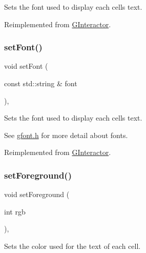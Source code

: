 Sets the font used to display each cell\textquotesingle{}s text. 



Reimplemented from \mbox{\hyperlink{classGInteractor_a2592348886ffea646c6534bf88f7c49d}{G\+Interactor}}.

\mbox{\label{classGTable_a51367c9fd2709973b1f7238734f93891}} 
\subsubsection{\texorpdfstring{set\+Font()}{setFont()}\hspace{0.1cm}{\footnotesize\ttfamily [2/2]}}
{\footnotesize\ttfamily void set\+Font (\begin{DoxyParamCaption}\item[{const std\+::string \&}]{font }\end{DoxyParamCaption})\hspace{0.3cm}{\ttfamily [override]}, {\ttfamily [virtual]}}



Sets the font used to display each cell\textquotesingle{}s text. 

See \mbox{\hyperlink{gfont_8h_source}{gfont.\+h}} for more detail about fonts. 

Reimplemented from \mbox{\hyperlink{classGInteractor_a8e096e8818d838aceae1d46d58fb3a7b}{G\+Interactor}}.

\mbox{\label{classGTable_a59f7cd2bd1708c12dfa52a8f7c7b79c9}} 
\subsubsection{\texorpdfstring{set\+Foreground()}{setForeground()}\hspace{0.1cm}{\footnotesize\ttfamily [1/2]}}
{\footnotesize\ttfamily void set\+Foreground (\begin{DoxyParamCaption}\item[{int}]{rgb }\end{DoxyParamCaption})\hspace{0.3cm}{\ttfamily [override]}, {\ttfamily [virtual]}}



Sets the color used for the text of each cell. 


